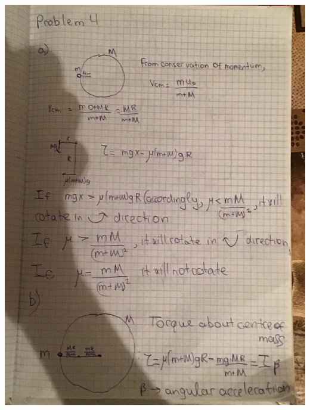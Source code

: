 \begin{sol}
    \begin{center}
        \includegraphics[width=\columnwidth]{image0.jpg}
    \end{center}
    \begin{center}

\end{center}
\end{sol}

